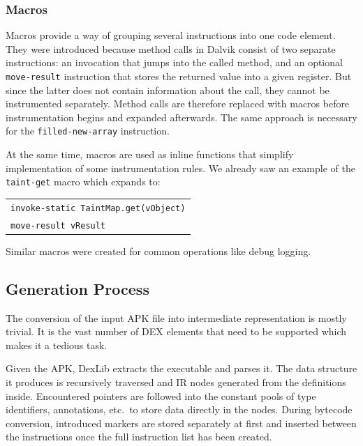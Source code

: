 \documentclass[12pt,twoside,notitlepage]{report}
\newcommand{\centerbox}[1] {
	\begin{center}
	\begin{footnotesize}
	\begin{tabular}{l}
	#1
	\end{tabular}
	\end{footnotesize}
	\end{center}
}
\newcommand{\asm}[1] {\texttt{#1}}
\begin{document}
\subsubsection{Macros}
\label{section:Code_Macros}

Macros provide a way of grouping several instructions into one code element. They were introduced because method calls in Dalvik consist of two separate instructions: an invocation that jumps into the called method, and an optional \verb$move-result$ instruction that stores the returned value into a given register. But since the latter does not contain information about the call, they cannot be instrumented separately. Method calls are therefore replaced with macros before instrumentation begins and expanded afterwards. The same approach is necessary for the \verb$filled-new-array$ instruction.

At the same time, macros are used as inline functions that simplify implementation of some instrumentation rules. We already saw an example of the \verb$taint-get$ macro which expands to:
	\centerbox{
		\asm{invoke-static TaintMap.get(vObject)} \\
		\asm{move-result vResult}
	}
Similar macros were created for common operations like debug logging.

\subsection{Generation Process}

The conversion of the input APK file into intermediate representation is mostly trivial. It is the vast number of DEX elements that need to be supported which makes it a tedious task. 

Given the APK, DexLib extracts the executable and parses it. The data structure it produces is recursively traversed and IR nodes generated from the definitions inside. Encountered pointers are followed into the constant pools of type identifiers, annotations, etc.\ to store data directly in the nodes. During bytecode conversion, introduced markers are stored separately at first and inserted between the instructions once the full instruction list has been created.


\end{document}
